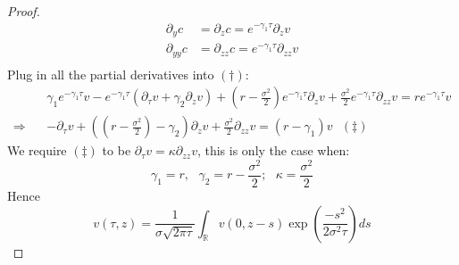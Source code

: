 \documentclass[a4paper, 10pt]{article}
\theoremstyle{definition}
\theoremstyle{hSol}
\begin{document}
\begin{proof}
\begin{equation}
\begin{split}
		\partial_y c &= \partial_z c = e^{-\gamma_1\tau}\partial_z v\\ 
		\partial_{yy} c &= \partial_{zz} c = e^{-\gamma_1\tau}\partial_{zz} v\\ 
	\end{split}
\end{equation}
Plug in all the partial derivatives into $(\dag)$:
\begin{equation}
	\begin{split}
		&\gamma_1 e^{-\gamma_1 \tau} v - e^{-\gamma_1 \tau}(\partial_{\tau}v + \gamma_2\partial_z v )+ \left(r-\frac{\sigma^2}{2}\right)e^{-\gamma_1\tau}\partial_z v + \frac{\sigma^2}{2} e^{-\gamma_1\tau}\partial_{zz} v = re^{-\gamma_1 \tau} v \\
		\Rightarrow~~~~&-\partial_{\tau} v +\left(\left(r-\frac{\sigma^2}{2}\right)- \gamma_2\right)\partial_z v+\frac{\sigma^2}{2}\partial_{zz} v= (r-\gamma_1) v~~~(\ddag)
	\end{split}
\end{equation}
We require $(\ddag)$ to be $\partial_{\tau}v = \kappa \partial_{zz}v$, this is only the case when:
\begin{equation}
	\gamma_1 = r,~~~\gamma_2 = r-\frac{\sigma^2}{2};~~~\kappa=\frac{\sigma^2}{2}
\end{equation}
Hence
\begin{equation}
	v(\tau,z) = \frac{1}{\sigma\sqrt{2\pi \tau}}\int_{\mathbb{R}} v(0,z-s) \exp\left(\frac{-s^2}{2\sigma^2 \tau}\right)ds
\end{equation}
\end{proof}
\end{document}

